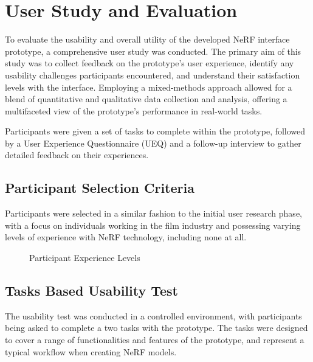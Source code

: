 %
\chapter{User Study and Evaluation}
\label{sec:study}

To evaluate the usability and overall utility of the developed NeRF interface prototype, a comprehensive user study was conducted. 
The primary aim of this study was to collect feedback on the prototype's user experience, identify any usability challenges participants encountered, and understand their satisfaction levels with the interface. 
Employing a mixed-methods approach allowed for a blend of quantitative and qualitative data collection and analysis, offering a multifaceted view of the prototype's performance in real-world tasks.

Participants were given a set of tasks to complete within the prototype, followed by a User Experience Questionnaire (UEQ) and a follow-up interview to gather detailed feedback on their experiences.

\section{Participant Selection Criteria}
\label{sec:study:criteria}

Participants were selected in a similar fashion to the initial user research phase, with a focus on individuals working in the film industry and possessing varying levels of experience with NeRF technology, including none at all.

\begin{figure}[htb]
  \centering
  \caption{Participant Experience Levels}
  \label{fig:study:experience}  
\end{figure}

\section{Tasks Based Usability Test}
\label{sec:study:tasks}

The usability test was conducted in a controlled environment, with participants being asked to complete a two tasks with the prototype.
The tasks were designed to cover a range of functionalities and features of the prototype, and represent a typical workflow when creating NeRF models.

